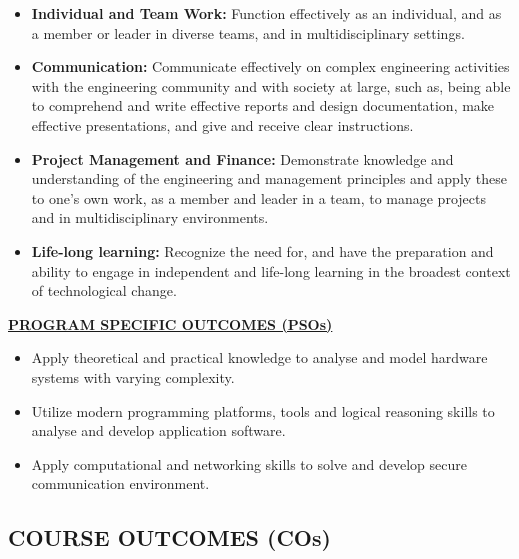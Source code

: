 \begin{itemize}[leftmargin=2.5cm]
    \item[\textbf{PO9.}] \textbf{Individual and Team Work:} Function effectively as an individual, and as a member or leader in diverse teams, and in multidisciplinary settings.
    
    \item[\textbf{PO10.}] \textbf{Communication:} Communicate effectively on complex engineering activities with the engineering community and with society at large, such as, being able to comprehend and write effective reports and design documentation, make effective presentations, and give and receive clear instructions.
    
    \item[\textbf{PO11.}] \textbf{Project Management and Finance:} Demonstrate knowledge and understanding of the engineering and management principles and apply these to one's own work, as a member and leader in a team, to manage projects and in multidisciplinary environments.
    
    \item[\textbf{PO12.}] \textbf{Life-long learning:} Recognize the need for, and have the preparation and ability to engage in independent and life-long learning in the broadest context of technological change.
\end{itemize}

\vspace{1cm}

\begin{center}
    \textbf{\underline{PROGRAM SPECIFIC OUTCOMES (PSOs)}}
\end{center}
\vspace{0.5cm}

\begin{itemize}[leftmargin=2.5cm]
    \item[\textbf{PSO1:}] Apply theoretical and practical knowledge to analyse and model hardware systems with varying complexity.
    \item[\textbf{PSO2:}] Utilize modern programming platforms, tools and logical reasoning skills to analyse and develop application software.
    \item[\textbf{PSO3:}] Apply computational and networking skills to solve and develop secure communication environment.
\end{itemize}

\newpage
\subsection*{COURSE OUTCOMES (COs)}

